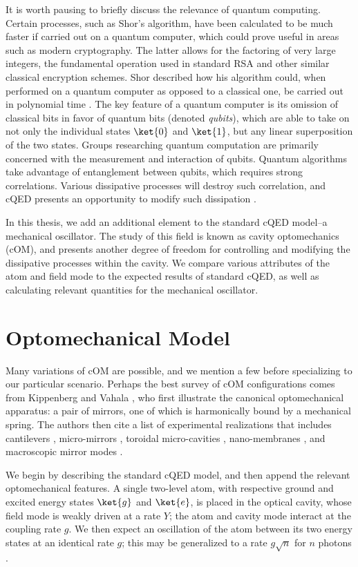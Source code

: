 It is worth pausing to briefly discuss the relevance of quantum computing. Certain processes, such as Shor's algorithm, have been calculated to be much faster if carried out on a quantum computer, which could prove useful in areas such as modern cryptography. The latter allows for the factoring of very large integers, the fundamental operation used in standard RSA and other similar classical encryption schemes. Shor described how his algorithm could, when performed on a quantum computer as opposed to a classical one, be carried out in polynomial time \cite{shor1999}. The key feature of a quantum computer is its omission of classical bits in favor of quantum bits (denoted \emph{qubits}), which are able to take on not only the individual states $\ket{0}$ and $\ket{1}$, but any linear superposition of the two states. Groups researching quantum computation are primarily concerned with the measurement and interaction of qubits. Quantum algorithms take advantage of entanglement between qubits, which requires strong correlations. Various dissipative processes will destroy such correlation, and cQED presents an opportunity to modify such dissipation \cite{charliethesis}.

In this thesis, we add an additional element to the standard cQED model--a mechanical oscillator. The study of this field is known as cavity optomechanics (cOM), and presents another degree of freedom for controlling and modifying the dissipative processes within the cavity. We compare various attributes of the atom and field mode to the expected results of standard cQED, as well as calculating relevant quantities for the mechanical oscillator.

\section{Optomechanical Model}
Many variations of cOM are possible, and we mention a few before specializing to our particular scenario. Perhaps the best survey of cOM configurations comes from Kippenberg and Vahala \cite{kippenberg2007}, who first illustrate the canonical optomechanical apparatus: a pair of mirrors, one of which is harmonically bound by a mechanical spring. The authors then cite a list of experimental realizations that includes cantilevers \cite{kleckner2006}, micro-mirrors \cite{arcizet2006, gigan2006}, toroidal micro-cavities \cite{kippenberg2005, schliesser2006}, nano-membranes \cite{thompson2007}, and macroscopic mirror modes \cite{corbitt2007}.

We begin by describing the standard cQED model, and then append the relevant optomechanical features. A single two-level atom, with respective ground and excited energy states $\ket{g}$ and $\ket{e}$, is placed in the optical cavity, whose field mode is weakly driven at a rate $Y$; the atom and cavity mode interact at the coupling rate $g$. We then expect an oscillation of the atom between its two energy states at an identical rate $g$; this may be generalized to a rate $g\sqrt{n}$ for $n$ photons \cite{phasespace}.

